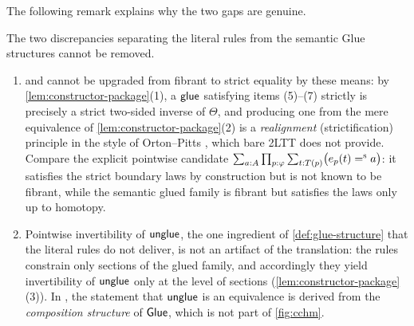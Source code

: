 \begin{longversion}
The following remark explains why the two gaps are genuine.

\begin{remark}\label{rem:connection-gaps}
	The two discrepancies separating the literal rules from the semantic
	Glue structures cannot be removed.
	\begin{enumerate}
		\item {} and  cannot be upgraded from
		fibrant to strict equality by these means: by
		\cref{lem:constructor-package}(1), a $\mathsf{glue}$ satisfying items
		(5)--(7) strictly is precisely a strict two-sided inverse of
		$\Theta$, and producing one from the mere equivalence of
		\cref{lem:constructor-package}(2) is a \emph{realignment}
		(strictification) principle in the style of Orton--Pitts
		\citep[Sec.~6]{OrtonPitts2018}, which bare 2LTT does not provide.
		Compare the explicit pointwise candidate
		$\sum_{a:A}\prod_{p:\varphi}\sum_{t:T(p)}\bigl(e_p(t)\mathrel{=^\textup{s}} a\bigr)$:
		it satisfies the strict boundary laws by construction but is not
		known to be fibrant, while the semantic glued family is fibrant but
		satisfies the laws only up to homotopy.
		\item Pointwise invertibility of $\mathsf{unglue}$, the one ingredient
		of \cref{def:glue-structure} that the literal rules do not deliver,
		is not an artifact of the translation: the rules constrain only
		sections of the glued family, and accordingly they yield
		invertibility of $\mathsf{unglue}$ only at the level of sections
		(\cref{lem:constructor-package}(3)). In
		\citet[Secs.~6--7]{CCHM2018}, the statement that $\mathsf{unglue}$ is an
		equivalence is derived from the \emph{composition structure} of
		${\sf Glue}$, which is not part of \cref{fig:cchm}.
	\end{enumerate}
\end{remark}
\end{longversion}

